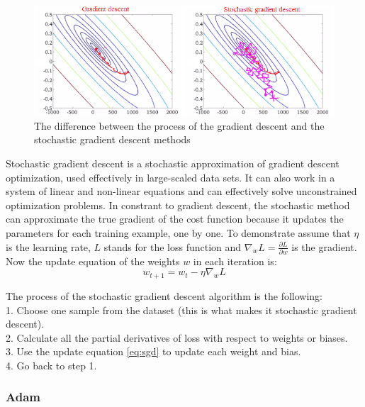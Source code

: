\begin{figure}[h]
	\centering
	\includegraphics[height=0.3\linewidth]{./figures/stochastic}
	\caption{The difference between the process of the gradient descent and the stochastic gradient descent methods}
	\label{fig:stochastic}
\end{figure}
Stochastic gradient descent \cite{Bottou2012} is a stochastic approximation of gradient descent optimization, used effectively in large-scaled data sets. It can also work in a system of linear and non-linear equations and can effectively solve unconstrained optimization problems. In constrant to gradient descent, the stochastic method can approximate the true gradient of the cost function because it updates the parameters for each training example, one by one. To demonstrate assume that $\eta$ is the learning rate, $L$ stands for the loss function and $\nabla_w L = \frac{\partial L}{\partial w}$ is the gradient. Now the update equation of the weights $w$ in each iteration is:
\begin{equation} w_{t+1} = w_t - \eta \nabla_w L \label{eq:sgd} \end{equation} 

\noindent The process of the stochastic gradient descent algorithm is the following:\\
1. Choose one sample from the dataset (this is what makes it stochastic gradient descent).\\
2. Calculate all the partial derivatives of loss with respect to weights or biases. \\
3. Use the update equation \eqref{eq:sgd} to update each weight and bias.\\
4. Go back to step 1.


\subsubsection{Adam}

